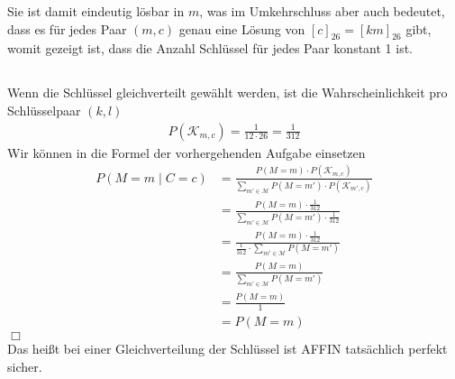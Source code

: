 \documentclass{../crypto}
\begin{document}
Sie ist damit eindeutig lösbar in $m$, was im Umkehrschluss aber auch bedeutet, dass es für jedes Paar $(m,c)$ genau eine Lösung von $\left[c\right]_{26}=\left[km\right]_{26}$ gibt, womit gezeigt ist, dass die Anzahl Schlüssel für jedes Paar konstant 1 ist.

\subsection{}

Wenn die Schlüssel gleichverteilt gewählt werden, ist die Wahrscheinlichkeit pro Schlüsselpaar $(k,l)$
\begin{align*}
P(\mathcal{K}_{m,c}) = \frac{1}{12\cdot 26} = \frac{1}{312}
\end{align*}
Wir können in die Formel der vorhergehenden Aufgabe einsetzen
\begin{align*}
P(M=m \mid C=c) &= \frac{P(M=m)\cdot
P(\mathcal{K}_{m,c})}{\sum_{m'\in\mathcal{M}} P(M=m')\cdot
P(\mathcal{K}_{m',c})} \\
            &= \frac{P(M=m)\cdot
\frac{1}{312}}{\sum_{m'\in\mathcal{M}} P(M=m')\cdot
\frac{1}{312}} \\
            &= \frac{P(M=m)\cdot
\frac{1}{312}}{\frac{1}{312}\cdot\sum_{m'\in\mathcal{M}} P(M=m')} \\
            &= \frac{P(M=m)}{\sum_{m'\in\mathcal{M}} P(M=m')} \\
            &= \frac{P(M=m)}{1} \\
            &= P(M=m)
\end{align*}
\hfill$\Box$ \\
Das heißt bei einer Gleichverteilung der Schlüssel ist AFFIN tatsächlich perfekt sicher.
\end{document}

